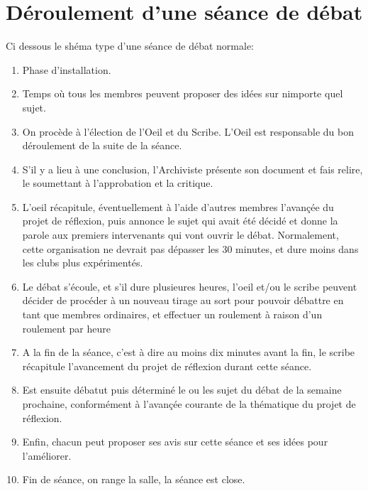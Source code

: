 \documentclass[a4paper,11pt]{article}
\begin{document}
\section{Déroulement d'une séance de débat}
Ci dessous le shéma type d'une séance de débat normale:
\begin{enumerate}
 \item Phase d'installation.
 \item Temps où tous les membres peuvent proposer des idées sur nimporte quel sujet.
 \item On procède à l'élection de l'Oeil et du Scribe. L'Oeil est responsable du bon déroulement de la suite de la séance.
 \item S'il y a lieu à une conclusion, l'Archiviste présente son document et fais relire, le soumettant à l'approbation et la critique.
 \item L'oeil récapitule, éventuellement à l'aide d'autres membres l'avançée du projet de réflexion, puis annonce le sujet qui avait été décidé et donne la parole aux premiers intervenants qui vont ouvrir le débat.
 Normalement, cette organisation ne devrait pas dépasser les 30 minutes, et dure moins dans les clubs plus expérimentés.
 \item Le débat s'écoule, et s'il dure plusieures heures, l'oeil et/ou le scribe peuvent décider de procéder à un nouveau tirage au sort pour pouvoir débattre en tant que membres ordinaires, et effectuer un roulement à raison d'un roulement par heure
 \item A la fin de la séance, c'est à dire au moins dix minutes avant la fin, le scribe récapitule l'avancement du projet de réflexion durant cette séance. 
 \item Est ensuite débatut puis déterminé le ou les sujet du débat de la semaine prochaine, conformément à l'avançée courante de la thématique du projet de réflexion.
 \item Enfin, chacun peut proposer ses avis sur cette séance et ses idées pour l'améliorer.
 \item Fin de séance, on range la salle, la séance est close.
\end{enumerate}
\end{document}
